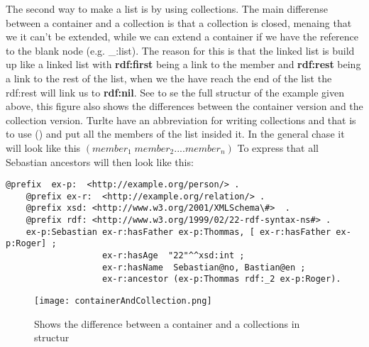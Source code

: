The second way to make a list is by using collections. The main differense between a container 
and a collection is that a collection is closed, menaing that we it can't be extended, 
while we can extend a container if we have the reference to the blank node (e.g. \_:list). The reason 
for this is that the linked list is build up like a linked list with \textbf{rdf:first} being a link to the member
and \textbf{rdf:rest} being a link to the rest of the list, when we the have reach the end of the 
list the rdf:rest will link us to \textbf{rdf:nil}. See  to se the 
full structur of the example given above, this figure also shows the differences between the container version
and the collection version. Turlte have an abbreviation for writing collections and that is 
to use () and put all the members of the list insided it. In the general chase it will look like this 
$(member_1 \;member_2 .... member_n)$
To express that all Sebastian ancestors will then look like this:
\begin{lstlisting}[frame=single, language=turtle]
    @prefix  ex-p:  <http://example.org/person/> . 
    @prefix ex-r:  <http://example.org/relation/> . 
    @prefix xsd: <http://www.w3.org/2001/XMLSchema\#>  . 
    @prefix rdf: <http://www.w3.org/1999/02/22-rdf-syntax-ns#> .
    ex-p:Sebastian ex-r:hasFather ex-p:Thommas, [ ex-r:hasFather ex-p:Roger] ; 
                   ex-r:hasAge  "22"^^xsd:int ; 
                   ex-r:hasName  Sebastian@no, Bastian@en ;
                   ex-r:ancestor (ex-p:Thommas rdf:_2 ex-p:Roger).
\end{lstlisting}

\begin{figure}
    \centering
    \texttt{[image: containerAndCollection.png]}
    \caption{Shows the difference between a container and a collections in structur}
    \label{fig:containerAndCollection}
\end{figure}

